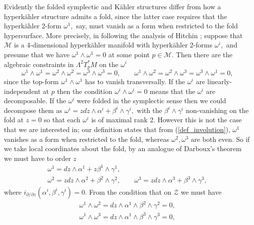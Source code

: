 \documentclass[a4paper,12pt, onecolumn, notitlepage]{article}
\theoremstyle{definition}
\theoremstyle{remark}
\newcommand{\al}{\alpha}
\newcommand{\w}{\omega}
\newcommand{\K}{K\"ahler }
\newcommand{\HK}{hyperk\"ahler }
\begin{document}
Evidently the folded symplectic and \K structures differ from how a \HK structure admits a fold, since the latter case requires that the \HK 2-form $\w^{1},$ say, must vanish as a form when restricted to the fold hypersurface. More precisely, in following the analysis of Hitchin \cite{hitchin_2015}; suppose that $\mathcal{M}$ is a 4-dimensional \HK manifold with \HK 2-forms $\w^{i},$ and presume that we have $\w^{1}\wedge\w^{1}=0$ at some point $p\in \mathcal{M}.$ Then there are the algebraic constraints in $\Lambda^{2}T_{p}^{\ast}M$ on the $\w^{i}$
\begin{equation*}
	\w^{1}\wedge\w^{1}=\w^{2}\wedge\w^{2}=\w^{3}\wedge\w^{3}=0, \qquad \w^{1}\wedge\w^{2}=\w^{2}\wedge\w^{3}=\w^{3}\wedge\w^{1}=0,
\end{equation*}
since the top-form $\w^{1}\wedge\w^{1}$ has to vanish transversally. If the $\w^{i}$ are linearly-independent at $p$ then the condition $\w^{i}\wedge\w^{i}=0$ means that the $\w^{i}$ are decomposable. If the $\w^{i}$ were folded in the symplectic sense then we could decompose them as $\w^{i} = zdz\wedge\al^{i} + \beta^{i}\wedge\gamma^{i},$ with the $\beta^{i}\wedge\gamma^{i}$ non-vanishing on the fold at $z=0$ so that each $\w^{i}$ is of maximal rank 2. However this is not the case that we are interested in; our definition states that from (\ref{def_involution}), $\w^{1}$ vanishes as a form when restricted to the fold, whereas $\w^{2},\w^{3}$ are both even. So if we take local coordinates about the fold, by an analogue of Darboux's theorem we must have to order $z$
\begin{subequations}
	\begin{gather}
	\label{folded_kforms}
	\w^{1} = dz\wedge\al^{1} + z\beta^{1}\wedge\gamma^{1},\\\nonumber
	\w^{2} = zdz\wedge\al^{2} + \beta^{2}\wedge\gamma^{2},\qquad\w^{3} = zdz\wedge\al^{3} + \beta^{3}\wedge\gamma^{3},
	\end{gather}
\end{subequations}
where $i_{\partial/\partial z}(\al^{i},\beta^{i},\gamma^{i})=0.$ From the condition that on $\mathcal{Z}$ we must have
\begin{subequations}
	\begin{gather}
	\w^{1}\wedge\w^{2}=dz\wedge\al^{1}\wedge\beta^{2}\wedge\gamma^{2} = 0,\label{hk_vanishing1}\\
	\w^{1}\wedge\w^{3}=dz\wedge\al^{1}\wedge\beta^{3}\wedge\gamma^{3} = 0,\label{hk_vanishing2}
	\end{gather}
\end{subequations}
\end{document}
